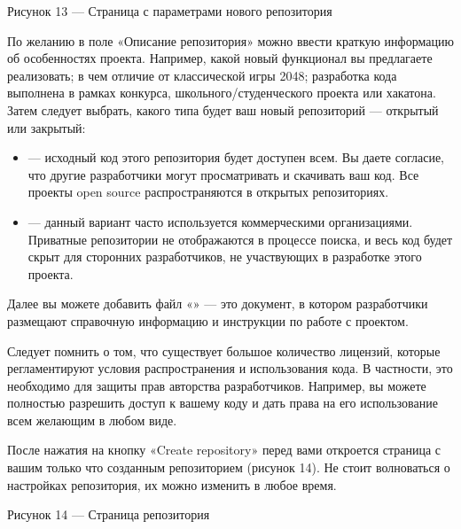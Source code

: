 \documentclass[letterpaper,10pt,russian]{sphinxmanual}
\begin{document}
\sphinxAtStartPar
{}

\sphinxAtStartPar
Рисунок 13 — Страница с параметрами нового репозитория

\sphinxAtStartPar
По желанию в поле «Описание репозитория» можно ввести краткую информацию об особенностях проекта. Например, какой новый функционал вы предлагаете реализовать; в чем отличие от классической игры 2048; разработка кода выполнена в рамках конкурса, школьного/студенческого проекта или хакатона. Затем следует выбрать, какого типа будет ваш новый репозиторий — открытый или закрытый:
\begin{itemize}
\item {} 
\sphinxAtStartPar
{} — исходный код этого репозитория будет доступен всем. Вы даете согласие, что другие разработчики могут просматривать и скачивать ваш код. Все проекты open source распространяются в открытых репозиториях.

\item {} 
\sphinxAtStartPar
{} — данный вариант часто используется коммерческими организациями. Приватные репозитории не отображаются в процессе поиска, и весь код будет скрыт для сторонних разработчиков, не участвующих в разработке этого проекта.

\end{itemize}

\sphinxAtStartPar
Далее вы можете добавить файл «» — это документ, в котором разработчики размещают справочную информацию и инструкции по работе с проектом.

\sphinxAtStartPar
Следует помнить о том, что существует большое количество лицензий, которые регламентируют условия распространения и использования кода. В частности, это необходимо для защиты прав авторства разработчиков. Например, вы можете полностью разрешить доступ к вашему коду и дать права на его использование всем желающим в любом виде.

\sphinxAtStartPar
После нажатия на кнопку «Create repository» перед вами откроется страница с вашим только что созданным репозиторием (рисунок 14). Не стоит волноваться о настройках репозитория, их можно изменить в любое время.

\sphinxAtStartPar
{}

\sphinxAtStartPar
Рисунок 14 — Страница репозитория
\end{document}
